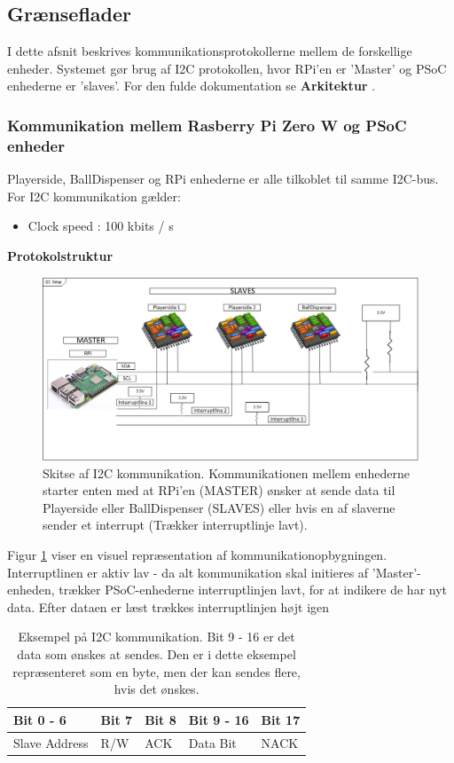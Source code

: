 \documentclass[Rapport/Rapport_main.tex]{subfiles}
\begin{document}
\subsection{Grænseflader}\label{sec:rap_interfaces}
I dette afsnit beskrives kommunikationsprotokollerne mellem de forskellige enheder. Systemet gør brug af I2C protokollen, hvor RPi'en er 'Master' og PSoC enhederne er 'slaves'. For den fulde dokumentation se \textbf{Arkitektur} .
\subsubsection{Kommunikation mellem Rasberry Pi Zero W og PSoC enheder}
Playerside, BallDispenser og RPi enhederne er alle tilkoblet til samme I2C-bus. For I2C kommunikation gælder: 
\begin{itemize}
    \item Clock speed : 100 kbits / s 
\end{itemize}
\textbf{Protokolstruktur}
\begin{figure}[H]
    \centering
    \includegraphics[width=\textwidth]{Rapport/Arkitektur/graphics/I2C-Illustration.png}
   \caption{Skitse af I2C kommunikation. Kommunikationen mellem enhederne starter enten med at RPi'en (MASTER) ønsker at sende data til Playerside eller BallDispenser (SLAVES) eller hvis en af slaverne sender et interrupt (Trækker interruptlinje lavt).}
    \label{fig:sketch_interrut}
\end{figure}
Figur \ref{fig:sketch_interrut} viser en visuel repræsentation af kommunikationopbygningen. Interruptlinen er aktiv lav - da alt kommunikation skal initieres af 'Master'-enheden, trækker PSoC-enhederne interruptlinjen lavt, for at indikere de har nyt data. Efter dataen er læst trækkes interruptlinjen højt igen
\begin{table}[H]
    \centering
    \begin{tabular}{|L{0.2\textwidth}|L{0.15\textwidth}|L{0.15\textwidth}|L{0.15\textwidth}|L{0.15\textwidth}|}
\hline
\textbf{Bit 0 - 6} & \textbf{Bit 7} & \textbf{Bit 8} & \textbf{Bit 9 - 16}  & \textbf{Bit 17} \\ \hline
Slave Address & R/W & ACK & Data Bit & NACK \\ \hline
\end{tabular}
    \caption{Eksempel på I2C kommunikation. Bit 9 - 16 er det data som ønskes at sendes. Den er i dette eksempel repræsenteret som en byte, men der kan sendes flere, hvis det ønskes.}
\end{table}
\end{document}
